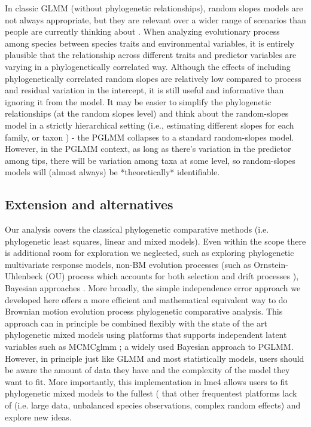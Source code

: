 In classic GLMM (without phylogenetic relationships), random slopes models are not always appropriate, but they are relevant over a wider range of scenarios than people are currently thinking about \cite{schielzeth2008conclusions, cleasby2015quantifying}.
When analyzing evolutionary process among species between species traits and environmental variables, it is entirely plausible that the relationship across different traits and predictor variables are varying in a phylogenetically correlated way.
Although the effects of including phylogenetically correlated random slopes are relatively low compared to process and residual variation in the intercept, it is still useful and informative than ignoring it from the model.
It may be easier to simplify the phylogenetic relationships (at the random slopes level) and think about the random-slopes model in a strictly hierarchical setting (i.e., estimating different slopes for each family, or taxon \cite{bunnefeld2012island}) - the PGLMM collapses to a standard random-slopes model. 
However, in the PGLMM context, as long as there's variation in the predictor among tips, there will be variation among taxa at some level, so random-slopes models will (almost always) be *theoretically* identifiable.

\subsection{Extension and alternatives}

Our analysis covers the classical phylogenetic comparative methods (i.e. phylogenetic least squares, linear and mixed models).
Even within the scope there is additional room for exploration we neglected, such as exploring phylogenetic multivariate response models, non-BM evolution processes (such as Ornstein-Uhlenbeck (OU) process which accounts for both selection and drift processes \cite{butler2004phylogenetic}), Bayesian approaches \cite{hadfield2010general}.
More broadly, the simple independence error approach we developed here offers a more efficient and mathematical equivalent way to do Brownian motion evolution process phylogenetic comparative analysis. 
This approach can in principle be combined flexibly with the state of the art phylogenetic mixed models using platforms that supports independent latent variables such as MCMCglmm \cite{hadfield2010mcmc}; a widely used Bayesian approach to PGLMM.
However, in principle just like GLMM and most statistically models, users should be aware the amount of data they have and the complexity of the model they want to fit.
More importantly, this implementation in lme4 allows users to fit phylogenetic mixed models to the fullest ( that other frequentest platforms lack of (i.e. large data, unbalanced species observations, complex random effects) and explore new ideas.


